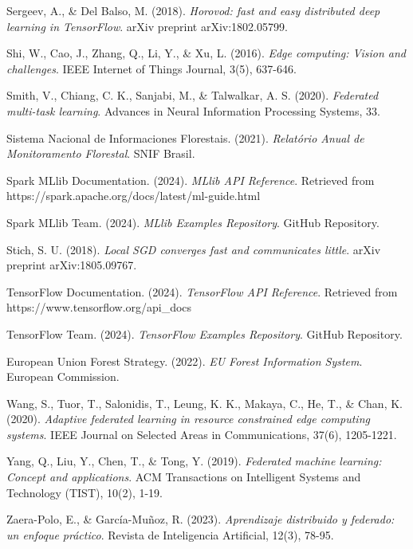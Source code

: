 \begin{thebibliography}{99}
	Sergeev, A., \& Del Balso, M. (2018).
	\textit{Horovod: fast and easy distributed deep learning in TensorFlow}.
	arXiv preprint arXiv:1802.05799.
	
	Shi, W., Cao, J., Zhang, Q., Li, Y., \& Xu, L. (2016).
	\textit{Edge computing: Vision and challenges}.
	IEEE Internet of Things Journal, 3(5), 637-646.
	
	Smith, V., Chiang, C. K., Sanjabi, M., \& Talwalkar, A. S. (2020).
	\textit{Federated multi-task learning}.
	Advances in Neural Information Processing Systems, 33.
	
	Sistema Nacional de Informaciones Florestais. (2021).
	\textit{Relatório Anual de Monitoramento Florestal}.
	SNIF Brasil.
	
	Spark MLlib Documentation. (2024).
	\textit{MLlib API Reference}.
	Retrieved from https://spark.apache.org/docs/latest/ml-guide.html
	
	Spark MLlib Team. (2024).
	\textit{MLlib Examples Repository}.
	GitHub Repository.
	
	Stich, S. U. (2018).
	\textit{Local SGD converges fast and communicates little}.
	arXiv preprint arXiv:1805.09767.
	
	TensorFlow Documentation. (2024).
	\textit{TensorFlow API Reference}.
	Retrieved from https://www.tensorflow.org/api_docs
	
	TensorFlow Team. (2024).
	\textit{TensorFlow Examples Repository}.
	GitHub Repository.
	
	European Union Forest Strategy. (2022).
	\textit{EU Forest Information System}.
	European Commission.
	
	Wang, S., Tuor, T., Salonidis, T., Leung, K. K., Makaya, C., He, T., \& Chan, K. (2020).
	\textit{Adaptive federated learning in resource constrained edge computing systems}.
	IEEE Journal on Selected Areas in Communications, 37(6), 1205-1221.
	
	Yang, Q., Liu, Y., Chen, T., \& Tong, Y. (2019).
	\textit{Federated machine learning: Concept and applications}.
	ACM Transactions on Intelligent Systems and Technology (TIST), 10(2), 1-19.
	
	Zaera-Polo, E., \& García-Muñoz, R. (2023).
	\textit{Aprendizaje distribuido y federado: un enfoque práctico}.
	Revista de Inteligencia Artificial, 12(3), 78-95.
	

\end{thebibliography}
